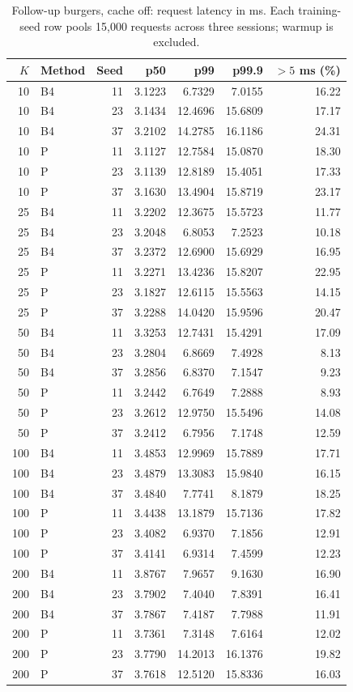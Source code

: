 \begin{table}[ht]
\centering\small
\caption{Follow-up burgers, cache off: request latency in ms. Each training-seed row pools 15,000 requests across three sessions; warmup is excluded.}\label{tab:e2_seed_burgers_off}
\begin{tabular}{@{}rlrrrrr@{}}\toprule
$K$ & Method & Seed & p50 & p99 & p99.9 & $>5$ ms (\%)\\\midrule
10 & B4 & 11 & 3.1223 & 6.7329 & 7.0155 & 16.22\\
10 & B4 & 23 & 3.1434 & 12.4696 & 15.6809 & 17.17\\
10 & B4 & 37 & 3.2102 & 14.2785 & 16.1186 & 24.31\\
10 & P & 11 & 3.1127 & 12.7584 & 15.0870 & 18.30\\
10 & P & 23 & 3.1139 & 12.8189 & 15.4051 & 17.33\\
10 & P & 37 & 3.1630 & 13.4904 & 15.8719 & 23.17\\
25 & B4 & 11 & 3.2202 & 12.3675 & 15.5723 & 11.77\\
25 & B4 & 23 & 3.2048 & 6.8053 & 7.2523 & 10.18\\
25 & B4 & 37 & 3.2372 & 12.6900 & 15.6929 & 16.95\\
25 & P & 11 & 3.2271 & 13.4236 & 15.8207 & 22.95\\
25 & P & 23 & 3.1827 & 12.6115 & 15.5563 & 14.15\\
25 & P & 37 & 3.2288 & 14.0420 & 15.9596 & 20.47\\
50 & B4 & 11 & 3.3253 & 12.7431 & 15.4291 & 17.09\\
50 & B4 & 23 & 3.2804 & 6.8669 & 7.4928 & 8.13\\
50 & B4 & 37 & 3.2856 & 6.8370 & 7.1547 & 9.23\\
50 & P & 11 & 3.2442 & 6.7649 & 7.2888 & 8.93\\
50 & P & 23 & 3.2612 & 12.9750 & 15.5496 & 14.08\\
50 & P & 37 & 3.2412 & 6.7956 & 7.1748 & 12.59\\
100 & B4 & 11 & 3.4853 & 12.9969 & 15.7889 & 17.71\\
100 & B4 & 23 & 3.4879 & 13.3083 & 15.9840 & 16.15\\
100 & B4 & 37 & 3.4840 & 7.7741 & 8.1879 & 18.25\\
100 & P & 11 & 3.4438 & 13.1879 & 15.7136 & 17.82\\
100 & P & 23 & 3.4082 & 6.9370 & 7.1856 & 12.91\\
100 & P & 37 & 3.4141 & 6.9314 & 7.4599 & 12.23\\
200 & B4 & 11 & 3.8767 & 7.9657 & 9.1630 & 16.90\\
200 & B4 & 23 & 3.7902 & 7.4040 & 7.8391 & 16.41\\
200 & B4 & 37 & 3.7867 & 7.4187 & 7.7988 & 11.91\\
200 & P & 11 & 3.7361 & 7.3148 & 7.6164 & 12.02\\
200 & P & 23 & 3.7790 & 14.2013 & 16.1376 & 19.82\\
200 & P & 37 & 3.7618 & 12.5120 & 15.8336 & 16.03\\
\bottomrule\end{tabular}
\end{table}

